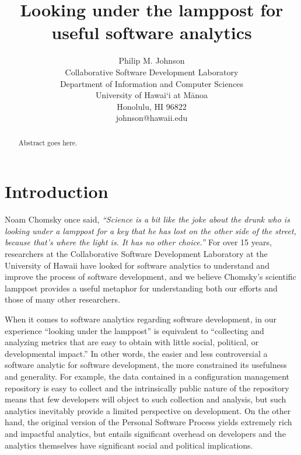 \documentclass[]{article}
\begin{document}


\title{{\bf Looking under the lamppost for useful software analytics}} 

\author{Philip M. Johnson\\
        Collaborative Software Development Laboratory\\
        Department of Information and Computer Sciences\\
        University of Hawai`i at M\=anoa\\
        Honolulu, HI 96822\\
        johnson@hawaii.edu\\
}


\maketitle

\begin{abstract}  %
Abstract goes here.
\end{abstract}

\thispagestyle{empty}


\setlength{\parskip}{3pt plus 1pt minus 1pt} 

\section{Introduction}
Noam Chomsky once said, {\em ``Science is a bit like the joke about the drunk who is looking
under a lamppost for a key that he has lost on the other side of the street, because
that's where the light is. It has no other choice.'' \cite{Barsky98}}  For over 15 years, researchers at the
Collaborative Software Development Laboratory at the University of Hawaii have looked
for software analytics to understand and improve the process of software development, and
we believe Chomsky's scientific lamppost provides a useful metaphor for understanding
both our efforts and those of many other researchers. 

When it comes to software analytics regarding software development, in our experience
``looking under the lamppost'' is equivalent to ``collecting and analyzing metrics that
are easy to obtain with little social, political, or developmental impact.''  In other
words, the easier and less controversial a software analytic for software development, the
more constrained its usefulness and generality.  For example, the data contained in a
configuration management repository is easy to collect and the intrinsically public nature
of the repository means that few developers will object to such collection and analysis,
but such analytics inevitably provide a limited perspective on development.  On the other
hand, the original version of the Personal Software Process yields extremely rich and
impactful analytics, but entails significant overhead on developers and the analytics
themselves have significant social and political implications.
\end{document}
